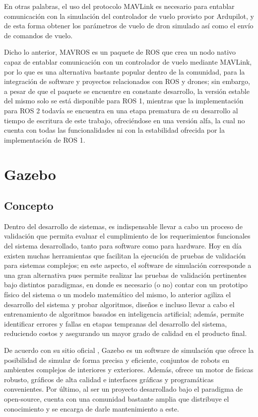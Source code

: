 En otras palabras, el uso del protocolo MAVLink es necesario para entablar comunicación con la simulación del controlador de vuelo provisto por Ardupilot, y de esta forma obtener los parámetros de vuelo de dron simulado así como el envío de comandos de vuelo.

Dicho lo anterior, MAVROS \cite{MAVROS} es un paquete de ROS que crea un nodo nativo capaz de entablar comunicación con un controlador de vuelo mediante MAVLink, por lo que es una alternativa bastante popular dentro de la comunidad, para la integración de software y proyectos relacionados con ROS y drones; sin embargo, a pesar de que el paquete se encuentre en constante desarrollo, la versión estable del mismo solo se está disponible para ROS 1, mientras que la implementación para ROS 2 todavía se encuentra en una etapa prematura de su desarrollo al tiempo de escritura de este trabajo, ofreciéndose en una versión alfa, la cual no cuenta con todas las funcionalidades ni con la estabilidad ofrecida por la implementación de ROS 1.


\section{Gazebo}

\subsection{Concepto}
Dentro del desarrollo de sistemas, es indispensable llevar a cabo un proceso de validación que permita evaluar el cumplimiento de los requerimientos funcionales del sistema desarrollado, tanto para software como para hardware. Hoy en día existen muchas herramientas que facilitan la ejecución de pruebas de validación para sistemas complejos; en este aspecto, el software de simulación corresponde a una gran alternativa pues permite realizar las pruebas de validación pertinentes bajo distintos paradigmas, en donde es necesario (o no) contar con un prototipo físico del sistema o un modelo matemático del mismo, lo anterior agiliza el desarrollo del sistema y probar algoritmos, diseños e incluso llevar a cabo el entrenamiento de algoritmos basados en inteligencia artificial; además, permite identificar errores y fallas en etapas tempranas del desarrollo del sistema, reduciendo costos y asegurando un mayor grado de calidad en el producto final.

De acuerdo con su sitio oficial \cite{gazebo_2014}, Gazebo es un software de simulación que ofrece la posibilidad de simular de forma precisa y eficiente, conjuntos de robots en ambientes complejos de interiores y exteriores. Además, ofrece un motor de físicas robusto, gráficos de alta calidad e interfaces gráficas y programáticas convenientes. Por último, al ser un proyecto desarrollado bajo el paradigma de open-source, cuenta con una comunidad bastante amplia que distribuye el conocimiento y se encarga de darle mantenimiento a este.

